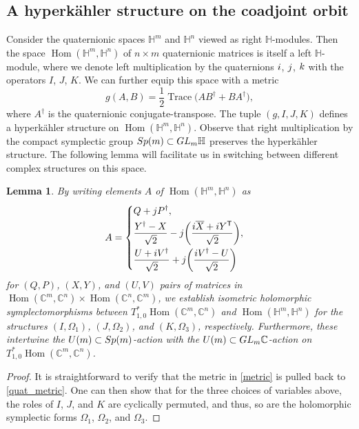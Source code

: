 \documentclass[11pt]{article}
\numberwithin{equation}{section}
\numberwithin{equation}{section}
\newtheorem{Lemma}[Theorem]{Lemma}
\DeclareMathOperator{\Hom}{Hom}
\DeclareMathOperator{\Tr}{Trace}
\newcommand{\C}{\mathbb{C}}
\newcommand{\Q}{\mathbb{H}}
\begin{document}
\setcounter{Theorem}{2}
\subsection{A hyperk\"{a}hler structure on the coadjoint orbit}
Consider the quaternionic spaces $\Q^m$ and $\Q^n$ viewed as right $\Q$-modules. Then the space $\Hom(\Q^m,\Q^n)$ of $n\times m$ quaternionic matrices is itself a left $\Q$-module, where we denote left multiplication by the quaternions ${\rm i}$, ${\rm j}$, ${\rm k}$
with the operators $I$, $J$, $K$. We can further equip this space with a metric%
\begin{equation}\label{quat_metric}
	g(A,B)=\frac{1}{2}\Tr\bigl(AB^\dagger+BA^\dagger\bigr),
\end{equation}
where $A^\dagger$ is the quaternionic conjugate-transpose. The tuple $(g,I,J,K)$ defines a hyperk\"{a}hler structure on $\Hom(\Q^m,\Q^n)$.
Observe that right multiplication by the compact symplectic group ${\rm Sp}(m)\subset {\rm GL}_m\Q$ preserves the hyperk\"{a}hler structure. The following lemma will facilitate us in switching between different complex structures on this space.
\begin{Lemma}\label{facilitate}
	By writing elements $A$ of $\Hom(\Q^m,\Q^n)$ as
	\begin{equation*}
		A=\begin{cases}
			\displaystyle Q+{\rm j}P^\dagger,\\[1mm]
			\displaystyle\frac{Y^\dagger-X}{\sqrt{2}}-{\rm j}\biggl(\frac{{\rm i}\overline{X}+{\rm i}Y^{\mathsf{T}}}{\sqrt{2}}\biggr),\vspace{1mm}\\
			\displaystyle\frac{U+{\rm i}V^\dagger}{\sqrt{2}}+{\rm j}\biggl(\frac{{\rm i}V^\dagger-U}{\sqrt{2}}\biggr)
		\end{cases}
	\end{equation*}
	for $(Q,P)$, $(X,Y)$, and $(U,V)$ pairs of matrices in $\Hom(\C^m,\C^n)\times\Hom(\C^n,\C^m)$, we establish isometric holomorphic symplectomorphisms between $T^*_{1,0}\Hom(\C^m,\C^n)$ and $\Hom(\Q^m,\Q^n)$ for the structures $(I,\Omega_1)$, $(J,\Omega_2)$, and $(K,\Omega_3)$, respectively. Furthermore, these intertwine the ${\rm U}(m)\subset {\rm Sp}(m)$-action with the ${\rm U}(m)\subset {\rm GL}_m\C$-action on $T^*_{1,0}\Hom(\C^m,\C^n)$.
\end{Lemma}
\begin{proof}
	It is straightforward to verify that the metric in \eqref{metric} is pulled back to \eqref{quat_metric}. One can then show that for the three choices of variables above, the roles of $I$, $J$, and $K$ are cyclically permuted, and thus, so are the holomorphic symplectic forms $\Omega_1$, $\Omega_2$, and $\Omega_3$.
\end{proof}
\end{document}
